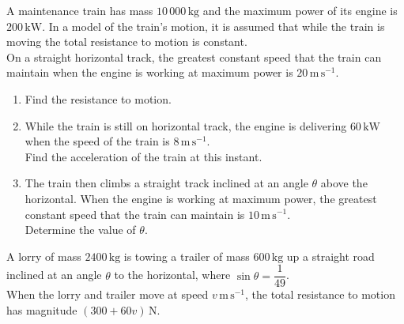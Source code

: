 \documentclass[leqno]{article}
\begin{document}
\djsFrontMatter
\begin{enumerate}[
  label=\textbf{\arabic*.},
  leftmargin=*,
  topsep=0pt,
  partopsep=0pt,
  parsep=0pt
]


\questionitem

A maintenance train has mass $10\,000\,\mathrm{kg}$ and the maximum power of its engine is $200\,\mathrm{kW}$. In a model of the train's motion, it is assumed that while the train is moving the total resistance to motion is constant. \\

On a straight horizontal track, the greatest constant speed that the train can maintain when the engine is working at maximum power is $20\,\mathrm{m\,s^{-1}}$. \\

\begin{enumerate}[label=\textbf{(\alph*)}]
  \item Find the resistance to motion.  \\
  \item While the train is still on horizontal track, the engine is delivering $60\,\mathrm{kW}$ when the speed of the train is $8\,\mathrm{m\,s^{-1}}$. \\
  Find the acceleration of the train at this instant.  \\
  \item The train then climbs a straight track inclined at an angle $\theta$ above the horizontal. When the engine is working at maximum power, the greatest constant speed that the train can maintain is $10\,\mathrm{m\,s^{-1}}$. \\
  Determine the value of $\theta$.  \\
\end{enumerate}

\newpage

\questionitem

A lorry of mass $2400\,\mathrm{kg}$ is towing a trailer of mass $600\,\mathrm{kg}$ up a straight road inclined at an angle $\theta$ to the horizontal, where $\sin\theta=\dfrac{1}{49}$. \\

When the lorry and trailer move at speed $v\,\mathrm{m\,s^{-1}}$, the total resistance to motion has magnitude $(300+60v)\,\mathrm{N}$. \\


\end{enumerate}
\end{document}
